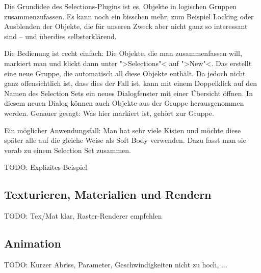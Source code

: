 \documentclass[10pt,DIV=14,a4paper]{scrartcl}
\begin{document}
Die Grundidee des Selections-Plugins ist es, Objekte in logischen
Gruppen zusammenzufassen. Es kann noch ein bisschen mehr, zum Beispiel
Locking oder Ausblenden der Objekte, die für unseren Zweck aber nicht
ganz so interessant sind -- und überdies selbst\-er\-klä\-rend.

Die Bedienung ist recht einfach: Die Objekte, die man zusammenfassen
will, markiert man und klickt dann unter ">Selections"< auf ">New"<. Das
erstellt eine neue Gruppe, die automatisch all diese Objekte enthält. Da
jedoch nicht ganz offensichtlich ist, dass dies der Fall ist, kann mit
einem Doppelklick auf den Namen des Selection Sets ein neues
Dialogfenster mit einer Übersicht öffnen. In diesem neuen Dialog können
auch Objekte aus der Gruppe herausgenommen werden. Genauer gesagt: Was
hier markiert ist, gehört zur Gruppe.

Ein möglicher Anwendungsfall: Man hat sehr viele Kisten und möchte diese
später alle auf die gleiche Weise als Soft Body verwenden. Dazu fasst
man sie vorab zu einem Selection Set zusammen.

TODO: Explizites Beispiel

\subsection{Texturieren, Materialien und Rendern}
TODO: Tex/Mat klar, Raster-Renderer empfehlen

\subsection{Animation}
TODO: Kurzer Abriss, Parameter, Geschwindigkeiten nicht zu hoch, ...

\end{document}
